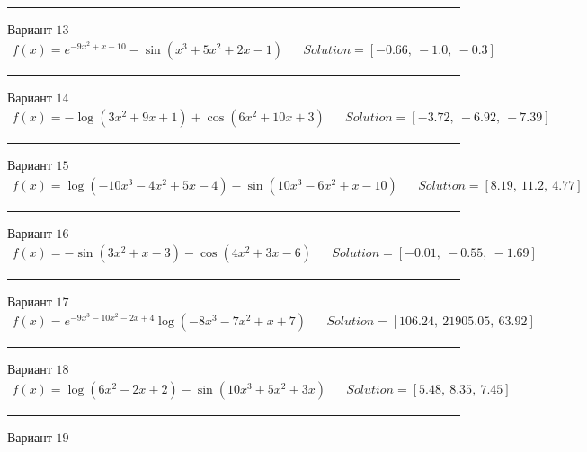 \documentclass[11pt]{report}
\begin{document}
\begin{center}
    \noindent\rule{8cm}{0.4pt}
\end{center}
Вариант \(13\)
\begin{align*}
    f(x) = e^{- 9 x^{2} + x - 10} - \sin{\left(x^{3} + 5 x^{2} + 2 x - 1 \right)} && Solution = \left[ -0.66, \  -1.0, \  -0.3\right]
\end{align*}
\begin{center}
    \noindent\rule{8cm}{0.4pt}
\end{center}
Вариант \(14\)
\begin{align*}
    f(x) = - \log{\left(3 x^{2} + 9 x + 1 \right)} + \cos{\left(6 x^{2} + 10 x + 3 \right)} && Solution = \left[ -3.72, \  -6.92, \  -7.39\right]
\end{align*}
\begin{center}
    \noindent\rule{8cm}{0.4pt}
\end{center}
Вариант \(15\)
\begin{align*}
    f(x) = \log{\left(- 10 x^{3} - 4 x^{2} + 5 x - 4 \right)} - \sin{\left(10 x^{3} - 6 x^{2} + x - 10 \right)} && Solution = \left[ 8.19, \  11.2, \  4.77\right]
\end{align*}
\begin{center}
    \noindent\rule{8cm}{0.4pt}
\end{center}
Вариант \(16\)
\begin{align*}
    f(x) = - \sin{\left(3 x^{2} + x - 3 \right)} - \cos{\left(4 x^{2} + 3 x - 6 \right)} && Solution = \left[ -0.01, \  -0.55, \  -1.69\right]
\end{align*}
\begin{center}
    \noindent\rule{8cm}{0.4pt}
\end{center}
Вариант \(17\)
\begin{align*}
    f(x) = e^{- 9 x^{3} - 10 x^{2} - 2 x + 4} \log{\left(- 8 x^{3} - 7 x^{2} + x + 7 \right)} && Solution = \left[ 106.24, \  21905.05, \  63.92\right]
\end{align*}
\begin{center}
    \noindent\rule{8cm}{0.4pt}
\end{center}
Вариант \(18\)
\begin{align*}
    f(x) = \log{\left(6 x^{2} - 2 x + 2 \right)} - \sin{\left(10 x^{3} + 5 x^{2} + 3 x \right)} && Solution = \left[ 5.48, \  8.35, \  7.45\right]
\end{align*}
\begin{center}
    \noindent\rule{8cm}{0.4pt}
\end{center}
Вариант \(19\)
\end{document}
